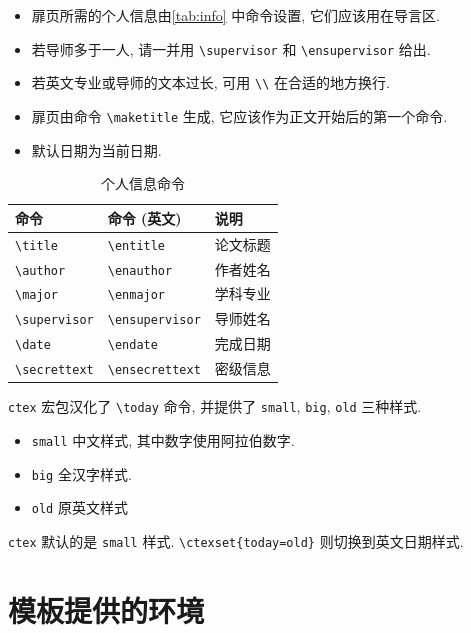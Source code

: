 \begin{itemize}
  \item
    扉页所需的个人信息由\autoref{tab:info} 中命令设置, 它们应该用在导言区.
  \item
    若导师多于一人, 请一并用 \verb|\supervisor| 和 \verb|\ensupervisor| 给出.
  \item
    若英文专业或导师的文本过长, 可用 \verb|\\| 在合适的地方换行.
  \item
    扉页由命令 \verb|\maketitle| 生成, 它应该作为正文开始后的第一个命令.
  \item
    默认日期为当前日期.
\end{itemize}

\begin{table}[!htb]
  \caption{个人信息命令}
  \label{tab:info}
  \centering
  \begin{tabular}{lll}
    \toprule
    命令            & 命令 (英文)       & 说明\\
    \midrule
    \verb|\title|        & \verb|\entitle|        & 论文标题\\
    \verb|\author|       & \verb|\enauthor|       & 作者姓名\\
    \verb|\major|        & \verb|\enmajor|        & 学科专业\\
    \verb|\supervisor|   & \verb|\ensupervisor|   & 导师姓名\\
    \verb|\date|         & \verb|\endate|         & 完成日期\\
    \verb|\secrettext|   & \verb|\ensecrettext|   & 密级信息\\
    \bottomrule
  \end{tabular}
\end{table}

\verb|ctex| 宏包汉化了 \verb|\today| 命令,
并提供了 \verb|small|, \verb|big|, \verb|old| 三种样式.
\begin{itemize}
  \item \verb|small| 中文样式, 其中数字使用阿拉伯数字.
  \item \verb|big| 全汉字样式.
  \item \verb|old| 原英文样式
\end{itemize}
\verb|ctex| 默认的是 \verb|small| 样式. \verb|\ctexset{today=old}| 则切换到英文日期样式.

\section{模板提供的环境}

